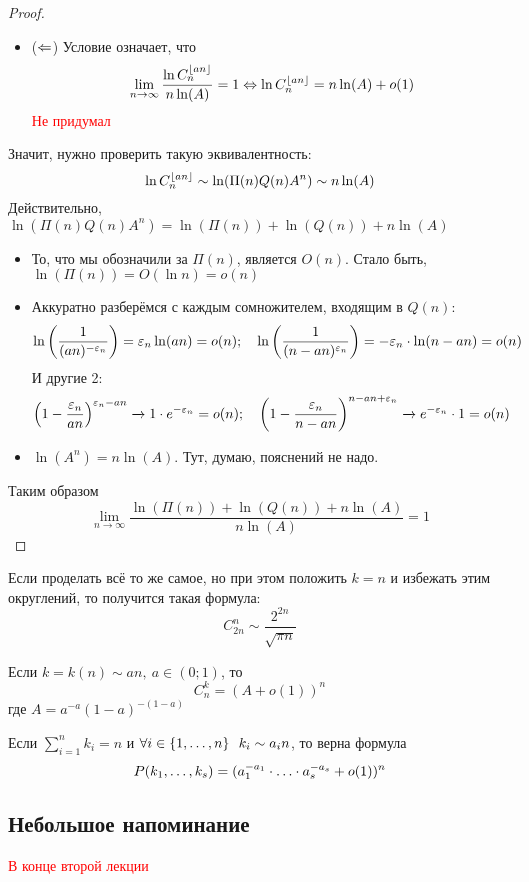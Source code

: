 \begin{proof}
\begin{itemize}
		\item ($\Leftarrow$) Условие означает, что
		\[
			\lim_{n \to \infty} \frac{\ln C_n^{\left\lfloor an \right\rfloor}}{n\ln(A)} = 1 \Leftrightarrow \ln C_n^{\left\lfloor an \right\rfloor} = n\ln(A) + o(1)
		\]
		\textcolor{red}{Не придумал}
	\end{itemize}
	Значит, нужно проверить такую эквивалентность:
	\[
		\ln C_n^{\left\lfloor an \right\rfloor} \sim \ln(\Pi(n)Q(n)A^n) \sim n\ln(A)	
	\]
	Действительно, $\ln(\Pi(n)Q(n)A^n) = \ln(\Pi(n)) + \ln(Q(n)) + n\ln(A)$
	\begin{itemize}
		\item То, что мы обозначили за $\Pi(n)$, является $O(n)$. Стало быть, $\ln(\Pi(n)) = O(\ln n) = o(n)$
		
		\item Аккуратно разберёмся с каждым сомножителем, входящим в $Q(n)$:
		\[
			\ln\left(\frac{1}{(an)^{-\varepsilon_n}}\right) = \varepsilon_n \ln(an) = o(n); \quad \ln\left(\frac{1}{(n - an)^{\varepsilon_n}}\right) = -\varepsilon_n \cdot \ln(n - an) = o(n)
		\]
		И другие 2:
		\[
			\left(1 - \frac{\varepsilon_n}{an}\right)^{\varepsilon_n - an} \xrightarrow{} 1 \cdot e^{-\varepsilon_n} = o(n); \quad \left(1 - \frac{\varepsilon_n}{n - an}\right)^{n - an + \varepsilon_n} \xrightarrow{} e^{-\varepsilon_n} \cdot 1 = o(n)
		\]
		
		\item $\ln(A^n) = n\ln(A)$. Тут, думаю, пояснений не надо.
	\end{itemize}
	Таким образом
	\[
		\lim_{n \to \infty} \frac{\ln(\Pi(n)) + \ln(Q(n)) + n\ln(A)}{n\ln(A)} = 1
	\]
\end{proof}

\begin{corollary}
	Если проделать всё то же самое, но при этом положить $k = n$ и избежать этим округлений, то получится такая формула:
	\[
		C_{2n}^n \sim \frac{2^{2n}}{\sqrt{\pi n}}
	\]
\end{corollary}

\begin{exercise}
	Если $k = k(n) \sim an,\ a \in (0; 1)$, то
	\[
		C_n^k = (A + o(1))^n
	\]
	где $A = a^{-a}(1 - a)^{-(1 - a)}$
\end{exercise}

\begin{exercise}
	Если $\sum_{i = 1}^n k_i = n$ и $\forall i \in \{1, \ldots, n\}\ \ k_i \sim a_in$, то верна формула
	\[
		P(k_1, \ldots, k_s) = (a_1^{-a_1} \cdot \ldots \cdot a_s^{-a_s} + o(1))^n
	\]
\end{exercise}

\subsection{Небольшое напоминание}

\textcolor{red}{В конце второй лекции}